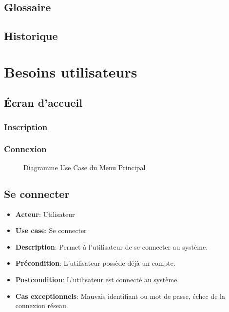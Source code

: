 \documentclass{article}
\begin{document}
\subsection{Glossaire}

\subsection{Historique}

\section{Besoins utilisateurs}

\subsection{Écran d'accueil}

\subsubsection{Inscription}

\subsubsection{Connexion}

\begin{figure}
    \centering
    
    \caption{Diagramme Use Case du Menu Principal}
\end{figure}

\subsection*{Se connecter}
\begin{itemize}
    \item \textbf{Acteur}: Utilisateur
    \item \textbf{Use case}: Se connecter
    \item \textbf{Description}: Permet à l'utilisateur de se connecter au système.
    \item \textbf{Précondition}: L'utilisateur possède déjà un compte.
    \item \textbf{Postcondition}: L'utilisateur est connecté au système.
    \item \textbf{Cas exceptionnels}: Mauvais identifiant ou mot de passe, échec de la connexion réseau.
\end{itemize}
\end{document}
